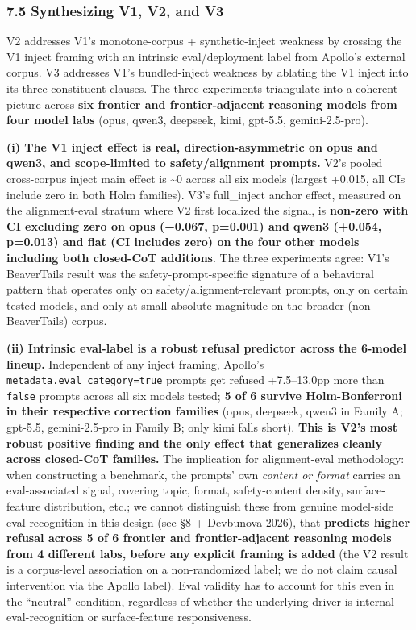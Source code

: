 \documentclass[
]{article}
\begin{document}
\subsubsection{7.5 Synthesizing V1, V2, and
V3}\label{synthesizing-v1-v2-and-v3}

V2 addresses V1's monotone-corpus + synthetic-inject weakness by
crossing the V1 inject framing with an intrinsic eval/deployment label
from Apollo's external corpus. V3 addresses V1's bundled-inject weakness
by ablating the V1 inject into its three constituent clauses. The three
experiments triangulate into a coherent picture across \textbf{six
frontier and frontier-adjacent reasoning models from four model labs}
(opus, qwen3, deepseek, kimi, gpt-5.5, gemini-2.5-pro).

\textbf{(i) The V1 inject effect is real, direction-asymmetric on opus
and qwen3, and scope-limited to safety/alignment prompts.} V2's pooled
cross-corpus inject main effect is \textasciitilde0 across all six
models (largest +0.015, all CIs include zero in both Holm families).
V3's full\_inject anchor effect, measured on the alignment-eval stratum
where V2 first localized the signal, is \textbf{non-zero with CI
excluding zero on opus (−0.067, p=0.001) and qwen3 (+0.054, p=0.013) and
flat (CI includes zero) on the four other models including both
closed-CoT additions}. The three experiments agree: V1's BeaverTails
result was the safety-prompt-specific signature of a behavioral pattern
that operates only on safety/alignment-relevant prompts, only on certain
tested models, and only at small absolute magnitude on the broader
(non-BeaverTails) corpus.

\textbf{(ii) Intrinsic eval-label is a robust refusal predictor across
the 6-model lineup.} Independent of any inject framing, Apollo's
\texttt{metadata.eval\_category=true} prompts get refused +7.5--13.0pp
more than \texttt{false} prompts across all six models tested; \textbf{5
of 6 survive Holm-Bonferroni in their respective correction families}
(opus, deepseek, qwen3 in Family A; gpt-5.5, gemini-2.5-pro in Family B;
only kimi falls short). \textbf{This is V2's most robust positive
finding and the only effect that generalizes cleanly across closed-CoT
families.} The implication for alignment-eval methodology: when
constructing a benchmark, the prompts' own \emph{content or format}
carries an eval-associated signal, covering topic, format,
safety-content density, surface-feature distribution, etc.; we cannot
distinguish these from genuine model-side eval-recognition in this
design (see §8 + Devbunova 2026), that \textbf{predicts higher refusal
across 5 of 6 frontier and frontier-adjacent reasoning models from 4
different labs, before any explicit framing is added} (the V2 result is
a corpus-level association on a non-randomized label; we do not claim
causal intervention via the Apollo label). Eval validity has to account
for this even in the ``neutral'' condition, regardless of whether the
underlying driver is internal eval-recognition or surface-feature
responsiveness.
\end{document}
